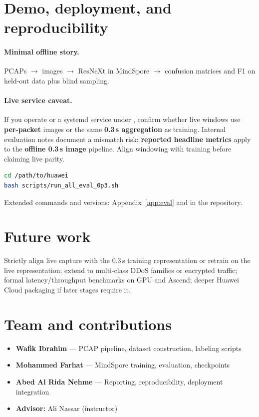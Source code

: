 \documentclass[11pt,a4paper]{article}
\newcommand{\MemberOneName}{Wafik Ibrahim}
\newcommand{\MemberOneRole}{PCAP pipeline, dataset construction, labeling scripts}
\newcommand{\MemberTwoName}{Mohammed Farhat}
\newcommand{\MemberTwoRole}{MindSpore training, evaluation, checkpoints}
\newcommand{\MemberThreeName}{Abed Al Rida Nehme}
\newcommand{\MemberThreeRole}{Reporting, reproducibility, deployment integration}
\newcommand{\AdvisorName}{Ali Nassar (instructor)}
\begin{document}
\section{Demo, deployment, and reproducibility}
\label{sec:deploy}

\paragraph{Minimal offline story.}
PCAPs $\rightarrow$ images $\rightarrow$ ResNeXt in MindSpore $\rightarrow$ confusion matrices and F1 on held-out data plus blind sampling.

\paragraph{Live service caveat.}
If you operate  or a systemd service under , confirm whether live windows use \textbf{per-packet} images or the same \textbf{0.3\,s aggregation} as training. Internal evaluation notes document a mismatch risk: \textbf{reported headline metrics} apply to the \textbf{offline 0.3\,s image} pipeline. Align windowing with training before claiming live parity.

\begin{lstlisting}[language=bash,caption={Reproduce primary metrics}]
cd /path/to/huawei
bash scripts/run_all_eval_0p3.sh
\end{lstlisting}

\noindent Extended commands and versions: Appendix~\ref{app:eval} and  in the repository.

\section{Future work}

Strictly align live capture with the 0.3\,s training representation or retrain on the live representation; extend to multi-class DDoS families or encrypted traffic; formal latency/throughput benchmarks on GPU and Ascend; deeper Huawei Cloud packaging if later stages require it.

\section{Team and contributions}

\begin{itemize}[leftmargin=*]
  \item \textbf{\MemberOneName} --- \MemberOneRole
  \item \textbf{\MemberTwoName} --- \MemberTwoRole
  \item \textbf{\MemberThreeName} --- \MemberThreeRole
  \item \textbf{Advisor:} \AdvisorName
\end{itemize}




\clearpage
\appendix

\end{document}
